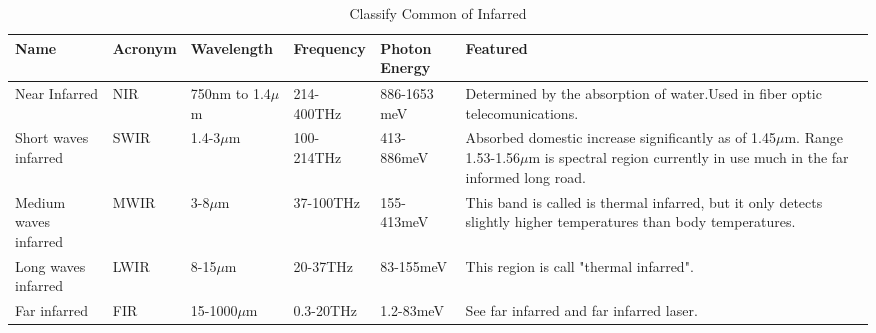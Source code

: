 \documentclass[a4paper]{report}
\begin{document}
        \begin{table}[ht]
            \centering
            \begin{tabular} { | p{1cm} | l | p{2cm} | p{2cm} | p{2cm} | p{3cm} | }
            \hline
            Name &Acronym &Wavelength &Frequency &Photon Energy &Featured \\ 
            \hline
            Near Infarred &NIR &750nm to 1.4$\mu$m &214-400THz &886-1653 meV &Determined by the absorption of water.Used in fiber optic telecomunications. \\ 
            \hline
            Short waves infarred &SWIR &1.4-3$\mu$m &100-214THz &413-886meV &Absorbed domestic increase significantly as of 1.45$\mu$m. Range 1.53-1.56$\mu$m is spectral region currently in use much in the far informed long road. \\ 
            \hline
            Medium waves infarred &MWIR &3-8$\mu$m &37-100THz &155-413meV &This band is called is thermal infarred, but it only detects slightly higher temperatures than body temperatures. \\ 
            \hline
            Long waves infarred &LWIR &8-15$\mu$m &20-37THz &83-155meV &This region is call "thermal infarred". \\ 
            \hline
            Far infarred &FIR &15-1000$\mu$m &0.3-20THz &1.2-83meV &See far infarred and far infarred laser. \\ 
            \hline
            \end{tabular}
            \caption{\label{tab:first}Classify Common of Infarred}
        \end{table}
\end{document}
